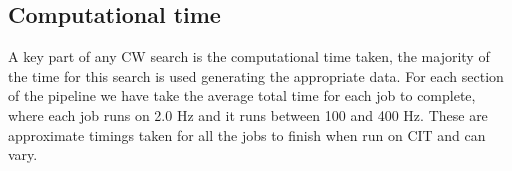 \subsection{\label{results:timing} Computational time}

A key part of any \ac{CW} search is the computational time taken, the majority of the time for this search is used generating the appropriate data. 
For each section of the pipeline we have take the average total time for each job to complete, where each job runs on 2.0 Hz and it runs between 100 and 400 Hz. These are approximate timings taken for all the jobs to finish when run on CIT and can vary.

\begin{table}[h]
	\centering                                                                                            
	\caption{\label{timing:table}Table shows the timings for each part of the search. These are approximate timings and vary when different amounts of data are input. This was run on data between 100-400 Hz.}
	
\end{table}

